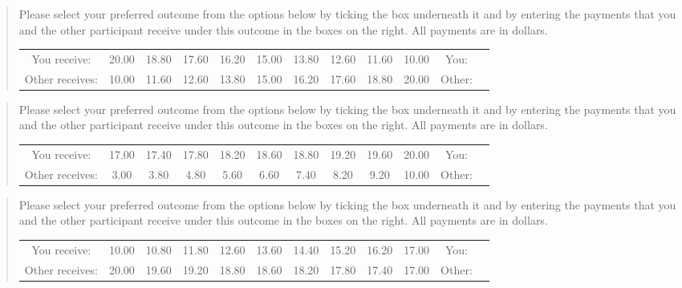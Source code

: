 \documentclass[11pt]{article}
\begin{document}
\begin{tcolorbox}
\begin{quote}
\begin{center}
Please select your preferred outcome from the options below by ticking the box underneath it and by entering the payments that you and the other participant receive under this outcome in the boxes on the right. All payments are in dollars.\\

\begin{tabular}{c|c|c|c|c|c|c|c|c|c|c|c|}
\cline{2-12} You receive: & 20.00&	18.80&	17.60	&16.20	&15.00	&13.80&	12.60	&11.60&	10.00 & You:& \\
Other receives: &10.00	&11.60&	12.60	&13.80	&15.00	&16.20&	17.60&	18.80&	20.00 &Other: & \\ \cline{2-12}
\end{tabular}
\end{center}
\end{quote}
\end{tcolorbox}

\begin{tcolorbox}
\begin{quote}
\begin{center}
Please select your preferred outcome from the options below by ticking the box underneath it and by entering the payments that you and the other participant receive under this outcome in the boxes on the right. All payments are in dollars.\\

\begin{tabular}{c|c|c|c|c|c|c|c|c|c|c|c|}
\cline{2-12} You receive: & 17.00&	17.40&	17.80	&18.20&	18.60	&18.80	&19.20&	19.60&	20.00 & You:& \\
Other receives: &3.00	&3.80	&4.80&	5.60	&6.60&	7.40&	8.20&	9.20&	10.00 &Other: & \\ \cline{2-12}
\end{tabular}
\end{center}
\end{quote}
\end{tcolorbox}

\begin{tcolorbox}
\begin{quote}
\begin{center}
Please select your preferred outcome from the options below by ticking the box underneath it and by entering the payments that you and the other participant receive under this outcome in the boxes on the right. All payments are in dollars.\\

\begin{tabular}{c|c|c|c|c|c|c|c|c|c|c|c|}
\cline{2-12} You receive: & 10.00	&10.80&	11.80&	12.60&	13.60&	14.40	&15.20&	16.20&	17.00 & You:& \\
Other receives: &20.00	&19.60&	19.20&	18.80&	18.60&	18.20&	17.80&	17.40&	17.00 &Other: & \\ \cline{2-12}
\end{tabular}
\end{center}
\end{quote}
\end{tcolorbox}								
\end{document}
